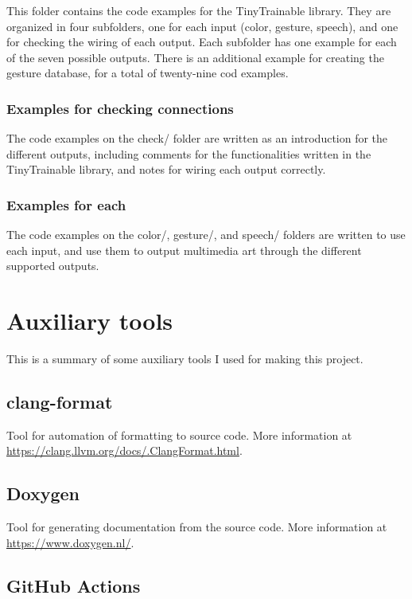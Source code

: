 This folder contains the code examples for the TinyTrainable library. They are organized in four subfolders, one for each input (color, gesture, speech), and one for checking the wiring of each output. Each subfolder has one example for each of the seven possible outputs. There is an additional example for creating the gesture database, for a total of twenty-nine cod examples.

\subsubsection{Examples for checking connections}

The code examples on the check/ folder are written as an introduction for the different outputs, including comments for the functionalities written in the TinyTrainable library, and notes for wiring each output correctly.

\subsubsection{Examples for each }

The code examples on the color/, gesture/, and speech/ folders are written to use each input, and use them to output multimedia art through the different supported outputs.

\section{Auxiliary tools}

This is a summary of some auxiliary tools I used for making this project.

\subsection{clang-format}

Tool for automation of formatting to source code. More information at \url{https://clang.llvm.org/docs/.ClangFormat.html}.

\subsection{Doxygen}

Tool for generating documentation from the source code. More information at \url{https://www.doxygen.nl/}.

\subsection{GitHub Actions}

